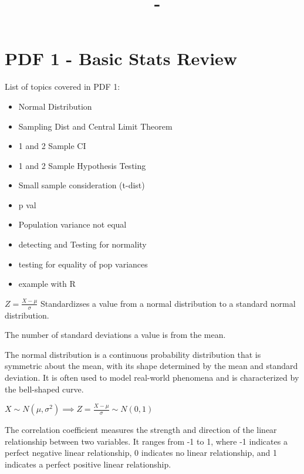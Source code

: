\documentclass[answers,12pt,addpoints]{exam}
\author{\name}
\title{\course \ - \assignment}
\begin{document}
\maketitle
\tableofcontents
\newpage
\section{PDF 1 - Basic Stats Review}
List of topics covered in PDF 1:
\begin{itemize}
    \item Normal Distribution
    \item Sampling Dist and Central Limit Theorem
    \item 1 and 2 Sample CI
    \item 1 and 2 Sample Hypothesis Testing
    \item Small sample consideration (t-dist)
    \item p val
    \item Population variance not equal
    \item detecting and Testing for normality
    \item testing for equality of pop variances
    \item example with R
\end{itemize}
\begin{definition}[Z-Score]
    $Z = \frac{X - \mu}{\sigma}$
    Standardizses a value from a normal distribution to a standard normal distribution.

    The number of standard deviations a value is from the mean.
\end{definition}

\begin{definition}
    The normal distribution is a continuous probability distribution that is symmetric about the mean, with its shape determined by the mean and standard deviation. It is often used to model real-world phenomena and is characterized by the bell-shaped curve.

    $X \sim N(\mu, \sigma^2) \implies Z = \frac{X - \mu}{\sigma} \sim N(0, 1)$
\end{definition}

\begin{definition}[Correlation]
    The correlation coefficient measures the strength and direction of the linear relationship between two variables. It ranges from -1 to 1, where -1 indicates a perfect negative linear relationship, 0 indicates no linear relationship, and 1 indicates a perfect positive linear relationship.
\end{definition}
\end{document}
